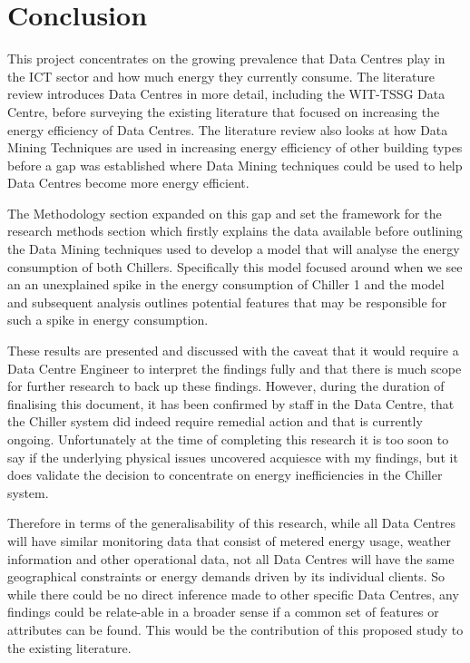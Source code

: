 \documentclass[12pt]{scrartcl}
\begin{document}
\section{Conclusion}
\label{sec:[Conclusion]}
This project concentrates on the growing prevalence that Data Centres play in the ICT sector and how much energy they currently consume. The literature review introduces Data Centres in more detail, including the WIT-TSSG Data Centre, before surveying the existing literature that focused on increasing the energy efficiency of Data Centres.  The literature review also looks at how Data Mining Techniques are used in increasing energy efficiency of other building types before a gap was established where Data Mining techniques could be used to help Data Centres become more energy efficient. 

The Methodology section expanded on this gap and set the framework for the research methods section which firstly explains the data available before outlining the Data Mining techniques used to develop a model that will analyse the energy consumption of both Chillers. Specifically this model focused around when we see an an unexplained spike in the energy consumption of Chiller 1 and the model and subsequent analysis outlines potential features that may be responsible for such a spike in energy consumption. 

These results are presented and discussed with the caveat that it would require a Data Centre Engineer to interpret the findings fully and that there is much scope for further research to back up these findings. However, during the duration of finalising this document, it has been confirmed by staff in the Data Centre, that the Chiller system did indeed require remedial action and that is currently ongoing. Unfortunately at the time of completing this research it is too soon to say if the underlying physical issues uncovered acquiesce with my findings, but it does validate the decision to concentrate on energy inefficiencies in the Chiller system.       

Therefore in terms of the generalisability of this research, while all Data Centres will have similar monitoring data that consist of metered energy usage, weather information and other operational data, not all Data Centres will have the same geographical constraints or energy demands driven by its individual clients. So while there could be no direct inference made to other specific Data Centres, any findings could be relate-able in a broader sense if a common set of features or attributes can be found. This would be the contribution of this proposed study to the existing literature.    
\end{document}
